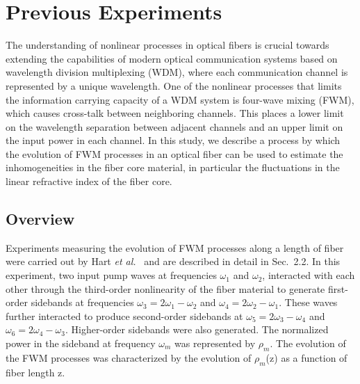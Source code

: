 \appendix
\renewcommand{\thechapter}{A}
\renewcommand{\chaptername}{Appendix}

\chapter{Previous Experiments}

The understanding of nonlinear processes in optical fibers is crucial towards
extending the capabilities of modern optical communication systems based on
wavelength division multiplexing (WDM), where each communication channel is
represented by a unique wavelength. One of the nonlinear processes that
limits the information carrying capacity of a WDM system is four-wave mixing
(FWM), which causes cross-talk between neighboring channels. This places a
lower limit on the wavelength separation between adjacent channels and an
upper limit on the input power in each channel. In this study, we describe
a process by which the evolution of FWM processes in an optical fiber can be
used to estimate the inhomogeneities in the fiber core material, in particular
the fluctuations in the linear refractive index of the fiber core.

\section{Overview}

Experiments measuring the evolution of FWM processes along a length of fiber
were carried out by Hart {\it et al.}\ \cite{hart1} and are described in detail in
Sec.\ 2.2. In this experiment, two input pump waves at frequencies
$\omega_1$ and $\omega_2$, interacted with each other through the third-order
nonlinearity of the fiber material to generate first-order sidebands at frequencies
$\omega_3 = 2\omega_1 - \omega_2$ and $\omega_4 = 2\omega_2 - \omega_1$.
These waves further interacted to produce second-order sidebands at
$\omega_5 = 2\omega_3 - \omega_4$ and $\omega_6 = 2\omega_4 - \omega_3$.
Higher-order sidebands were also generated. The normalized power in the
sideband at frequency $\omega_m$ was represented by $\rho_m$. The
evolution of the FWM processes was characterized by the evolution of
$\rho_m$(z) as a function of fiber length z.

